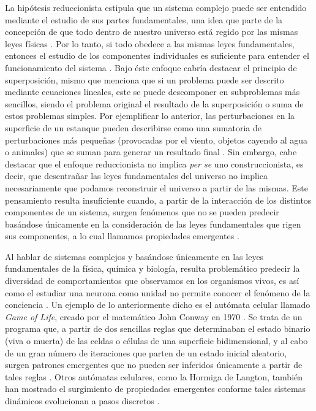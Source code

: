 \documentclass[
]{book}
\begin{document}
La hipótesis reduccionista estipula que un sistema complejo puede ser entendido mediante el estudio de sus partes fundamentales, una idea que parte de la concepción de que todo dentro de nuestro universo está regido por las mismas leyes físicas \citep{viniegra2014reduccionismo}. Por lo tanto, si todo obedece a las mismas leyes fundamentales, entonces el estudio de los componentes individuales es suficiente para entender el funcionamiento del sistema \citep{viniegra2014reduccionismo}. Bajo éste enfoque cabría destacar el principio de superposición, mismo que menciona que si un problema puede ser descrito mediante ecuaciones lineales, este se puede descomponer en subproblemas más sencillos, siendo el problema original el resultado de la superposición o suma de estos problemas simples. Por ejemplificar lo anterior, las perturbaciones en la superficie de un estanque pueden describirse como una sumatoria de perturbaciones más pequeñas (provocadas por el viento, objetos cayendo al agua o animales) que se suman para generar un resultado final \citep{anderson1972more}. Sin embargo, cabe destacar que el enfoque reduccionista no implica \emph{per se} uno construccionista, es decir, que desentrañar las leyes fundamentales del universo no implica necesariamente que podamos reconstruir el universo a partir de las mismas. Este pensamiento resulta insuficiente cuando, a partir de la interacción de los distintos componentes de un sistema, surgen fenómenos que no se pueden predecir basándose únicamente en la consideración de las leyes fundamentales que rigen sus componentes, a lo cual llamamos propiedades emergentes \citep{anderson1972more}.

Al hablar de sistemas complejos y basándose únicamente en las leyes fundamentales de la física, química y biología, resulta problemático predecir la diversidad de comportamientos que observamos en los organismos vivos, es así como el estudiar una neurona como unidad no permite conocer el fenómeno de la conciencia \citep{falkenburg2015more}. Un ejemplo de lo anteriormente dicho es el autómata celular llamado \emph{Game of Life}, creado por el matemático John Conway en 1970 \citep{gardner1970fantastic}. Se trata de un programa que, a partir de dos sencillas reglas que determinaban el estado binario (viva o muerta) de las celdas o células de una superficie bidimensional, y al cabo de un gran número de iteraciones que parten de un estado inicial aleatorio, surgen patrones emergentes que no pueden ser inferidos únicamente a partir de tales reglas \citep{gardner1970fantastic}. Otros autómatas celulares, como la Hormiga de Langton, también han mostrado el surgimiento de propiedades emergentes conforme tales sistemas dinámicos evolucionan a pasos discretos \citep{von1966theory}.
\end{document}
